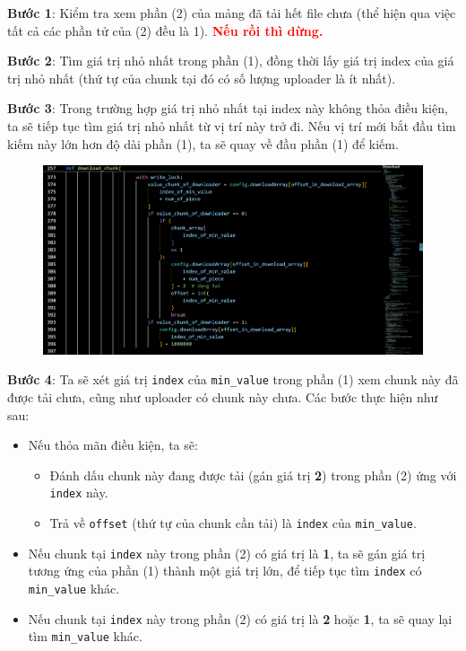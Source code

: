 \documentclass[a4paper]{article}
\begin{document}
\textbf{Bước 1}: Kiểm tra xem phần (2) của mảng đã tải hết file chưa (thể hiện qua việc tất cả các phần tử của (2) đều là 1). \textbf{\textcolor{red}{Nếu rồi thì dừng.}}

\textbf{Bước 2}: Tìm giá trị nhỏ nhất trong phần (1), đồng thời lấy giá trị index của giá trị nhỏ nhất (thứ tự của chunk tại đó có số lượng uploader là ít nhất).

\textbf{Bước 3}: Trong trường hợp giá trị nhỏ nhất tại index này không thỏa điều kiện, ta sẽ tiếp tục tìm giá trị nhỏ nhất từ vị trí này trở đi. Nếu vị trí mới bắt đầu tìm kiếm này lớn hơn độ dài phần (1), ta sẽ quay về đầu phần (1) để kiếm.
\begin{figure}[H]
    \centering
    \includegraphics[width=1\textwidth]{images/3.png}
    \captionsetup{labelformat=empty}
\end{figure}
\textbf{Bước 4}: Ta sẽ xét giá trị \texttt{index} của \texttt{min\_value} trong phần (1) xem chunk này đã được tải chưa, cũng như uploader có chunk này chưa. Các bước thực hiện như sau:
\begin{itemize}
    \item Nếu thỏa mãn điều kiện, ta sẽ:
    \begin{itemize}
        \item Đánh dấu chunk này đang được tải (gán giá trị \textbf{2}) trong phần (2) ứng với \texttt{index} này.
        \item Trả về \texttt{offset} (thứ tự của chunk cần tải) là \texttt{index} của \texttt{min\_value}.
    \end{itemize}
    \item Nếu chunk tại \texttt{index} này trong phần (2) có giá trị là \textbf{1}, ta sẽ gán giá trị tương ứng của phần (1) thành một giá trị lớn, để tiếp tục tìm \texttt{index} có \texttt{min\_value} khác.
    \item Nếu chunk tại \texttt{index} này trong phần (2) có giá trị là \textbf{2} hoặc \textbf{1}, ta sẽ quay lại tìm \texttt{min\_value} khác.
\end{itemize}
\end{document}
